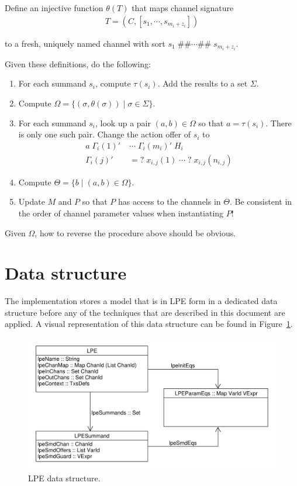 Define an injective function $\theta(T)$ that maps channel signature
\begin{align*}
T = (C, [s_1, \cdots{}, s_{m_i+z_i}])
\end{align*}

to a fresh, uniquely named channel with sort $s_1 \; \texttt{\#\#} \cdots{} \texttt{\#\#} \; s_{m_i+z_i}$.

Given these definitions, do the following:

\begin{enumerate}
\item For each summand $s_i$, compute $\tau(s_i)$.
Add the results to a set $\Sigma$.

\item Compute $\Omega = \{ (\sigma, \theta(\sigma)) \;|\; \sigma \in \Sigma \}$.

\item For each summand $s_i$, look up a pair $(a, b) \in \Omega$ so that $a = \tau(s_i)$.
There is only one such pair.
Change the action offer of $s_i$ to
\begin{align*}
a \; {\Gamma_i(1)}' \; &\cdots{} \; {\Gamma_i(m_i)}' \; H_i \\
{\Gamma_i(j)}' &= \texttt{?} \; x_{i,j}(1) \; \cdots{} \; \texttt{?} \; x_{i,j}(n_{i,j})
\end{align*}

\item Compute $\Theta = \{ b \;|\; (a, b) \in \Omega \}$.

\item Update $M$ and $P$ so that $P$ has access to the channels in $\Theta$.
Be consistent in the order of channel parameter values when instantiating $P$!
\end{enumerate}

Given $\Omega$, how to reverse the procedure above should be obvious.

\section{Data structure}

The implementation stores a \txs{} model that is in LPE form in a dedicated data structure before any of the techniques that are described in this document are applied.
A visual representation of this data structure can be found in Figure~\ref{lpedatastructure:fig}.

\begin{figure}[!ht]
\begin{center}
\includegraphics[width=0.7\linewidth]{images/lpe-types}
\caption{LPE data structure.}
\label{lpedatastructure:fig}
\end{center}
\end{figure}

